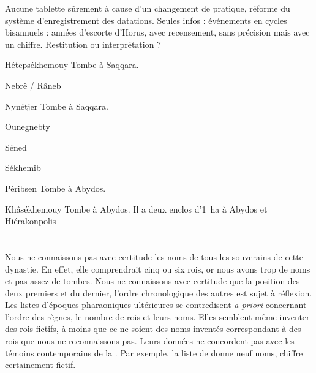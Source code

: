 \noindent{}

Aucune tablette \donc{} sûrement à cause d'un changement de pratique, 
réforme du système d'enregistrement des datations. Seules infos : 
\donc{} événements en cycles bisannuels : années d'escorte d'Horus, 
avec recensement, sans précision mais avec un chiffre. Restitution ou 
interprétation ?

\begin{listerois}
  \item [Hétepsékhemouy] Tombe à Saqqara.
  \item [Nebrê / Râneb]
  \item [Nynétjer] Tombe à Saqqara.
  \item [Ounegnebty]
  \item [Séned]
  \item [Sékhemib]
  \item [Péribsen] Tombe à Abydos.
  \item [Khâsékhemouy] Tombe à Abydos. Il a deux enclos 
        d'\SI{1}{\hectare} à Abydos et Hiérakonpolis
\end{listerois}

\section{\OK}


\subsection{\texorpdfstring{}{IIIe dynastie}}

Nous ne connaissons pas avec certitude les noms de tous les souverains 
de cette dynastie. En effet, elle comprendrait cinq ou six rois, or 
nous avons trop de noms et pas assez de tombes. Nous ne connaissons 
avec certitude que la position des deux premiers et du dernier, 
l'ordre chronologique des autres est sujet à réflexion. Les listes 
d'époques pharaoniques ultérieures se contredisent \emph{a priori} 
concernant l'ordre des règnes, le nombre de rois et leurs noms. Elles 
semblent même inventer des rois fictifs, à moins que ce ne soient des 
noms inventés correspondant à des rois que nous ne reconnaissons pas. 
Leurs données ne concordent pas avec les témoins contemporains de la 
. Par exemple, la liste de  donne neuf noms, 
chiffre certainement fictif.


